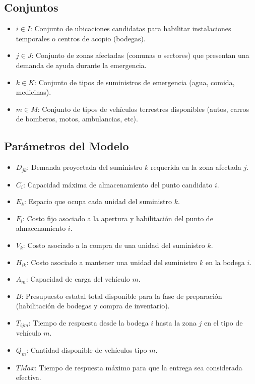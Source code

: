 \documentclass[letterpaper]{article}
\begin{document}
\begin{flushleft}
\subsection{Conjuntos}
\begin{itemize}
    \item $i \in I$: Conjunto de ubicaciones candidatas para habilitar instalaciones temporales o centros de acopio (bodegas).
    \item $j \in J$: Conjunto de zonas afectadas (comunas o sectores) que presentan una demanda de ayuda durante la emergencia.
    \item $k \in K$: Conjunto de tipos de suministros de emergencia (agua, comida, medicinas).
    \item $m \in M$: Conjunto de tipos de veh\'iculos terrestres disponibles (autos, carros de bomberos, motos, ambulancias, etc).
\end{itemize}

\subsection{Par\'ametros del Modelo}
\begin{itemize}
    \item $D_{jk}$: Demanda proyectada del suministro $k$ requerida en la zona afectada $j$.
    \item $C_i$: Capacidad m\'axima de almacenamiento del punto candidato $i$.
    \item $E_k$: Espacio que ocupa cada unidad del suministro $k$.
    \item $F_i$: Costo fijo asociado a la apertura y habilitaci\'on del punto de almacenamiento $i$.
    \item $V_k$: Costo asociado a la compra de una unidad del suministro $k$.
    \item $H_{ik}$: Costo asociado a mantener una unidad del suministro $k$ en la bodega $i$.
    \item $A_m$: Capacidad de carga del veh\'iculo $m$.
    \item $B$: Presupuesto estatal total disponible para la fase de preparaci\'on (habilitaci\'on de bodegas y compra de inventario).
    \item $T_{ijm}$: Tiempo de respuesta desde la bodega $i$ hasta la zona $j$ en el tipo de veh\'iculo $m$.
    \item $Q_m$: Cantidad disponible de veh\'iculos tipo $m$.
    \item $TMax$: Tiempo de respuesta m\'aximo para que la entrega sea considerada efectiva.
\end{itemize}


\end{flushleft}
\end{document}
